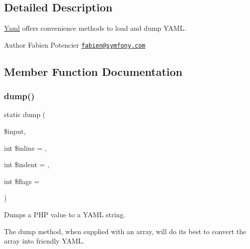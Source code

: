 \subsection{Detailed Description}
\mbox{\hyperlink{class_symfony_1_1_component_1_1_yaml_1_1_yaml}{Yaml}} offers convenience methods to load and dump Y\+A\+ML.

\begin{DoxyAuthor}{Author}
Fabien Potencier \href{mailto:fabien@symfony.com}{\tt fabien@symfony.\+com}
\end{DoxyAuthor}


\subsection{Member Function Documentation}
\mbox{\label{class_symfony_1_1_component_1_1_yaml_1_1_yaml_a26b0fb9733ab43ce9a9340845e78b7c3}} 
\subsubsection{\texorpdfstring{dump()}{dump()}}
{\footnotesize\ttfamily static dump (\begin{DoxyParamCaption}\item[{}]{\$input,  }\item[{int}]{\$inline = {},  }\item[{int}]{\$indent = {},  }\item[{int}]{\$flags = {} }\end{DoxyParamCaption})\hspace{0.3cm}{\ttfamily [static]}}

Dumps a P\+HP value to a Y\+A\+ML string.

The dump method, when supplied with an array, will do its best to convert the array into friendly Y\+A\+ML.


